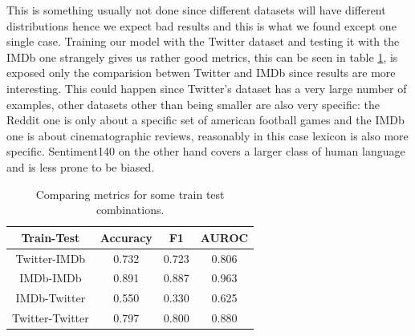 This is something usually not done since different datasets will have different distributions hence we expect bad results and this is what we found except one single case.
Training our model with the Twitter dataset and testing it with the IMDb one strangely gives us rather good metrics, this can be seen in table \ref{tab:versus_metrics}, is exposed only the comparision betwen Twitter and IMDb since results are more interesting. 
This could happen since Twitter's dataset has a very large number of examples, other datasets other than being smaller are also very specific: the Reddit one is only about a specific set of american football games and the IMDb one is about cinematographic reviews, reasonably in this case lexicon is also more specific. 
Sentiment140 on the other hand covers a larger class of human language and is less prone to be biased.

\begin{table}[h!t]
    \centering
    \caption{Comparing metrics for some train test combinations.}
    \label{tab:versus_metrics}
    \begin{tabular}{c|ccc}
        \hline
        Train-Test & Accuracy & F1 & AUROC \\
        \hline 
        Twitter-IMDb & 0.732 & 0.723 & 0.806 \\ 
        IMDb-IMDb & 0.891 & 0.887 & 0.963 \\ 
        IMDb-Twitter & 0.550 & 0.330 & 0.625 \\ 
        Twitter-Twitter & 0.797 & 0.800 & 0.880 \\ 
        \hline
    \end{tabular}
\end{table}
